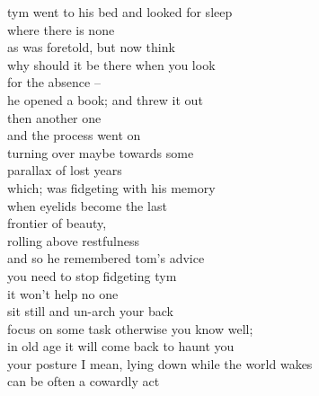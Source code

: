 tym went to his bed and looked for sleep\\
where there is none\\
as was foretold, but now think\\
why should it be there when you look\\
for the absence --\\
he opened a book; and threw it out\\

then another one\\
and the process went on\\
turning over maybe towards some\\
parallax of lost years\\
which; was fidgeting with his memory\\
when eyelids become the last\\
frontier of beauty,\\
rolling above restfulness\\
and so he remembered tom's advice\\

you need to stop fidgeting tym\\
it won't help no one\\
sit still and un-arch your back\\
focus on some task otherwise you know well;\\
in old age it will come back to haunt you\\
your posture I mean, lying down while the world wakes\\
can be often a cowardly act\\
